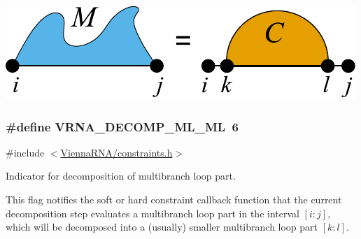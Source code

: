  
\begin{DoxyImageNoCaption}
  \mbox{\includegraphics[width=\textwidth,height=\textheight/2,keepaspectratio=true]{decomp_ml_stem}}
\end{DoxyImageNoCaption}
 \hypertarget{group__constraints_ga7f4cb9ff7a33e67f0539bd39e7b19a78}{}
\subsubsection[{V\+R\+N\+A\+\_\+\+D\+E\+C\+O\+M\+P\+\_\+\+M\+L\+\_\+\+M\+L}]{\setlength{\rightskip}{0pt plus 5cm}\#define V\+R\+N\+A\+\_\+\+D\+E\+C\+O\+M\+P\+\_\+\+M\+L\+\_\+\+M\+L~6}\label{group__constraints_ga7f4cb9ff7a33e67f0539bd39e7b19a78}


{\ttfamily \#include $<$\hyperlink{constraints_8h}{Vienna\+R\+N\+A/constraints.\+h}$>$}



Indicator for decomposition of multibranch loop part. 

This flag notifies the soft or hard constraint callback function that the current decomposition step evaluates a multibranch loop part in the interval $[i:j]$, which will be decomposed into a (usually) smaller multibranch loop part $[k:l]$.

